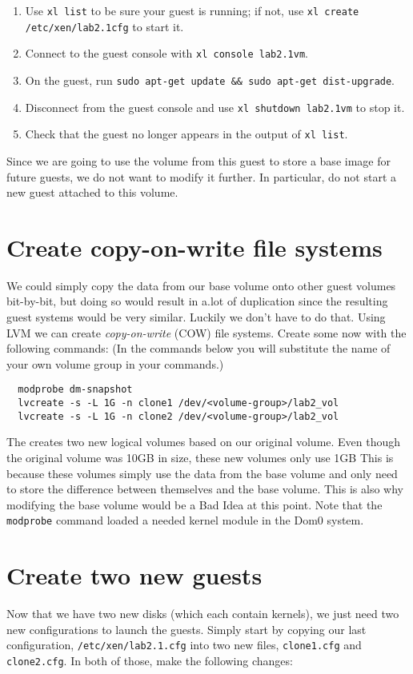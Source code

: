 \documentclass{article}
\begin{document}
\begin{enumerate}
  \item Use \texttt{xl list} to be sure your guest is running; if not, use \texttt{xl create /etc/xen/lab2.1cfg} to start it.
  \item Connect to the guest console with \texttt{xl console lab2.1vm}.
  \item On the guest, run \texttt{sudo apt-get update \&\& sudo apt-get dist-upgrade}.
  \item Disconnect from the guest console and use \texttt{xl shutdown lab2.1vm} to stop it.
  \item Check that the guest no longer appears in the output of \texttt{xl list}.
\end{enumerate}

Since we are going to use the volume from this guest to store a base image for future guests, we do not want to modify it further. In particular, do not start a new guest attached to this volume.

\section{Create copy-on-write file systems}
We could simply copy the data from our base volume onto other guest volumes bit-by-bit, but doing so would result in a.lot of duplication since the resulting guest systems would be very similar. Luckily we don't have to do that. Using LVM we can create \emph{copy-on-write} (COW) file systems. Create some now with the following  commands: (In the commands below you will substitute the name of your own volume group in your commands.)

\begin{verbatim}
  modprobe dm-snapshot
  lvcreate -s -L 1G -n clone1 /dev/<volume-group>/lab2_vol 
  lvcreate -s -L 1G -n clone2 /dev/<volume-group>/lab2_vol
\end{verbatim}

The creates two new logical volumes based on our original volume. Even though the original volume was 10GB in size, these new volumes only use 1GB This is because these volumes simply use the data from the base volume and only need to store the difference between themselves and the base volume. This is also why modifying the base volume would be a Bad Idea at this point. Note that the \texttt{modprobe} command loaded a needed kernel module in the Dom0 system.

\section{Create two new guests}
Now that we have two new disks (which each contain kernels), we just need two new configurations to launch the guests. Simply start by copying our last configuration, \texttt{/etc/xen/lab2.1.cfg} into two new files, \texttt{clone1.cfg} and \texttt{clone2.cfg}. In both of those, make the following changes:
\end{document}
